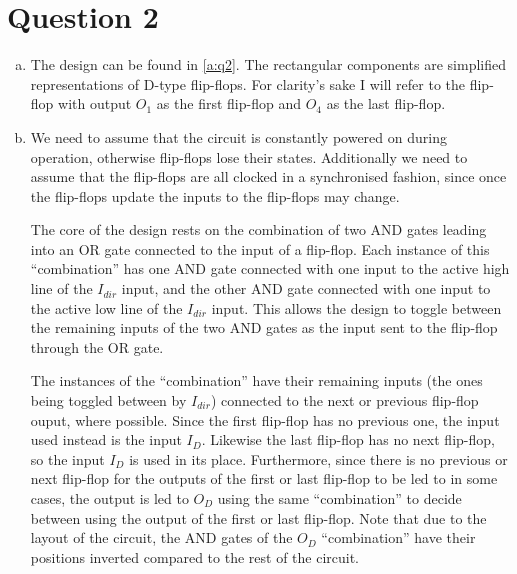 \documentclass[11pt]{article} %
\begin{document}
\section*{Question 2}
\begin{enumerate}[(a)]
	\item The design can be found in \cref{a:q2}. The rectangular components are simplified representations of D-type flip-flops. For clarity's sake I will refer to the flip-flop with output $O_1$ as the first flip-flop and $O_4$ as the last flip-flop.
	\item We need to assume that the circuit is constantly powered on during operation, otherwise flip-flops lose their states. Additionally we need to assume that the flip-flops are all clocked in a synchronised fashion, since once the flip-flops update the inputs to the flip-flops may change.

	The core of the design rests on the combination of two AND gates leading into an OR gate connected to the input of a flip-flop. Each instance of this ``combination'' has one AND gate connected with one input to the active high line of the $I_{dir}$ input, and the other AND gate connected with one input to the active low line of the $I_{dir}$ input. This allows the design to toggle between the remaining inputs of the two AND gates as the input sent to the flip-flop through the OR gate.
	
	The instances of the ``combination'' have their remaining inputs (the ones being toggled between by $I_{dir}$) connected to the next or previous flip-flop ouput, where possible. Since the first flip-flop has no previous one, the input used instead is the input $I_D$. Likewise the last flip-flop has no next flip-flop, so the input $I_D$ is used in its place. Furthermore, since there is no previous or next flip-flop for the outputs of the first or last flip-flop to be led to in some cases, the output is led to $O_D$ using the same ``combination'' to decide between using the output of the first or last flip-flop. Note that due to the layout of the circuit, the AND gates of the $O_D$ ``combination'' have their positions inverted compared to the rest of the circuit.
	

\end{enumerate}
\end{document}

